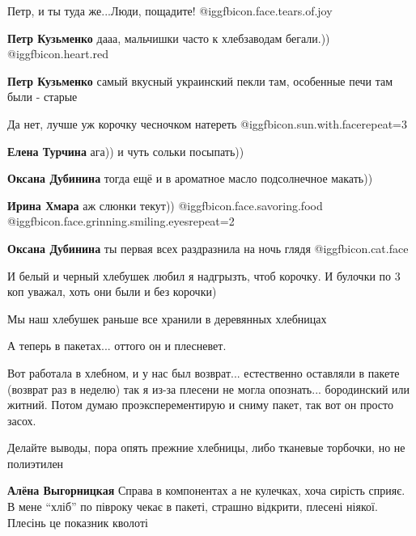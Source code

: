\begin{itemize}
\begin{itemize} %
Петр, и ты туда же...Люди, пощадите! @igg{fbicon.face.tears.of.joy} 

\textbf{Петр Кузьменко} дааа, мальчишки часто к хлебзаводам бегали.)) @igg{fbicon.heart.red}

\textbf{Петр Кузьменко} самый вкусный украинский пекли там, особенные печи там были - старые
\end{itemize} %

Да нет, лучше уж корочку чесночком натереть @igg{fbicon.sun.with.face}{repeat=3} 

\begin{itemize} %
\textbf{Елена Турчина} ага)) и чуть сольки посыпать))

\textbf{Оксана Дубинина} тогда ещё и в ароматное масло подсолнечное макать))

\textbf{Ирина Хмара} аж слюнки текут)) @igg{fbicon.face.savoring.food}  @igg{fbicon.face.grinning.smiling.eyes}{repeat=2} 

\textbf{Оксана Дубинина} ты первая всех раздразнила на ночь глядя  @igg{fbicon.cat.face} 
\end{itemize} %


И белый и черный хлебушек любил я надгрызть, чтоб корочку. И булочки по 3 коп
уважал, хоть они были и без корочки)


Мы наш хлебушек раньше все хранили в деревянных хлебницах

А теперь в пакетах... оттого он и плесневет.

Вот работала в хлебном, и у нас был возврат... естественно оставляли в
пакете (возврат раз в неделю) так я из-за плесени не могла опознать... бородинский
или житний. Потом думаю проэксперементирую и сниму пакет, так вот он просто
засох.

Делайте выводы, пора опять прежние хлебницы, либо тканевые торбочки, но не
полиэтилен

\begin{itemize} %
\textbf{Алёна Выгорницкая}
Справа в компонентах а не кулечках, хоча сирість сприяє.
В мене \enquote{хліб} по півроку чекає в пакеті, страшно відкрити, плесені ніякої.
Плесінь це показник кволоті


\end{itemize}
\end{itemize}
